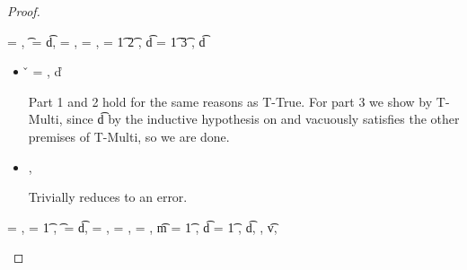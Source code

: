 \begin{lemma}
\begin{proof}
\begin{case}[T-DefMulti]
  \e{} = {\createmultiexp {\s{}} {}},
  \t{} = {\MultiFntype {\s{}} {\t{d}}},
  \thenprop{\prop{}} = {\topprop{}},
  \elseprop{\prop{}} = {\botprop{}},
  \s{} = {\ArrowOne {\x{}} {\t{1}} {\t{2}}
                          {
                                      {}}
                          {}},
  \t{d} = {\ArrowOne {\x{}} {\t{1}} {\t{3}}
                          {
                                      {}}
                          {}},
  \judgementtwo {\propenv{}} { {\t{d}}}


\begin{itemize}
  \item[]
\begin{subcase}[B-DefMulti]
  \v{} = { {\emptydisptable}},
  \opsem {\openv{}} {} {\v{d}}


Part 1 and 2 hold for the same reasons as T-True.
For part 3 we show 
by T-Multi, since \judgementtwo {} { {\t{d}}} by the inductive hypothesis on {}
and {\emptydisptable} vacuously satisfies the other premises of T-Multi, so we are done.

\end{subcase}
  \item[]
\begin{subcase}[BE-DefMulti] \opsem {\openv{}} {} {\errorvalv{}},
        \opsem {\openv{}} {\e{}} {\errorvalv{}}

        Trivially reduces to an error.

\end{subcase}
\end{itemize}
\end{case}

\begin{case}[T-DefMethod]
  \e{} = { {} {}},
   = {\abs {\x{}} {\t{1}} {}},
  \t{} = { {\t{d}}},
  \thenprop{\prop{}} = {\topprop{}},
  \elseprop{\prop{}} = {\botprop{}},
  \object{} = {\emptyobject{}},
  \t{m} = {\ArrowOne {\x{}} {\t{1}} {\s{}}
                     {
                                 {}}
                     {}},
  \t{d} = {\ArrowOne {\x{}} {\t{1}} {\sp{}}
                     {
                                 {}}
                     {}},
  \judgementtwo {\propenv{}} { { {\t{d}}}},
  ,
  \judgementtwo {\propenv{}}
               { {\t{v}}},
           { {\s{}}}
           {
                       {}}
           {}


\end{case}
\end{proof}
\end{lemma}
